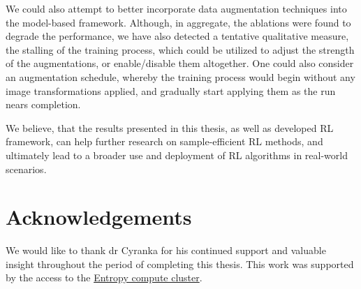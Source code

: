 \documentclass[en]{pracamgr}
\begin{document}
We could also attempt to better incorporate data augmentation techniques into the model-based framework. Although, in aggregate, the ablations were found to degrade the performance, we have also detected a tentative qualitative measure, the stalling of the training process, which could be utilized to adjust the strength of the augmentations, or enable/disable them altogether. One could also consider an augmentation schedule, whereby the training process would begin without any image transformations applied, and gradually start applying them as the run nears completion.

We believe, that the results presented in this thesis, as well as developed RL framework, can help further research on sample-efficient RL methods, and ultimately lead to a broader use and deployment of RL algorithms in real-world scenarios.

\section{Acknowledgements}

We would like to thank dr Cyranka for his continued support and valuable insight throughout the period of completing this thesis. This work was supported by the access to the \href{https://entropy-doc.mimuw.edu.pl/}{Entropy compute cluster}.

\printbibliography
\end{document}
